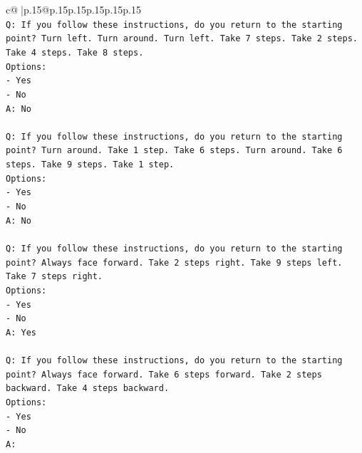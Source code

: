 \documentclass{article}
\begin{document}
{\begin{supertabular}{c@{$\;$}|p{.15\linewidth}@{}p{.15\linewidth}p{.15\linewidth}p{.15\linewidth}p{.15\linewidth}p{.15\linewidth}}
{{{\\ 
\texttt{Q: If you follow these instructions, do you return to the starting point? Turn left. Turn around. Turn left. Take 7 steps. Take 2 steps. Take 4 steps. Take 8 steps.} \\
\texttt{Options:} \\
\texttt{{-} Yes} \\
\texttt{{-} No} \\
\texttt{A: No} \\
\\ 
\texttt{Q: If you follow these instructions, do you return to the starting point? Turn around. Take 1 step. Take 6 steps. Turn around. Take 6 steps. Take 9 steps. Take 1 step.} \\
\texttt{Options:} \\
\texttt{{-} Yes} \\
\texttt{{-} No} \\
\texttt{A: No} \\
\\ 
\texttt{Q: If you follow these instructions, do you return to the starting point? Always face forward. Take 2 steps right. Take 9 steps left. Take 7 steps right.} \\
\texttt{Options:} \\
\texttt{{-} Yes} \\
\texttt{{-} No} \\
\texttt{A: Yes} \\
\\ 
\texttt{Q: If you follow these instructions, do you return to the starting point? Always face forward. Take 6 steps forward. Take 2 steps backward. Take 4 steps backward.} \\
\texttt{Options:} \\
\texttt{{-} Yes} \\
\texttt{{-} No} \\
\texttt{A:} \\
            }
        }
    }
     \\ \\


\end{supertabular}}
\end{document}
